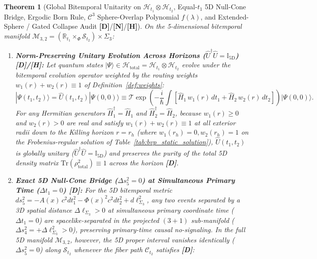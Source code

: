 \documentclass[11pt,a4paper]{article}
\newcommand{\catD}{\textbf{\textcolor{blue!75!black}{[D]}}}
\newcommand{\catH}{\textbf{\textcolor{orange!85!black}{[H]}}}
\newcommand{\catN}{\textbf{\textcolor{teal!75!black}{[N]}}}
\newtheorem{theorem}{Theorem}[section]
\theoremstyle{definition}
\theoremstyle{remark}
\begin{document}
\begin{theorem}[Global Bitemporal Unitarity on $\mathcal{H}_{t_1} \otimes \mathcal{H}_{t_2}$, Equal-$t_1$ 5D Null-Cone Bridge, Ergodic Born Rule, $\mathcal{C}^3$ Sphere-Overlap Polynomial $f(\lambda)$, and Extended-Sphere / Gated Collapse Audit \catD/\catN/\catH]
\label{thm:bitemporal_unitarity_null_bridge}
On the 5-dimensional bitemporal manifold $\mathcal{M}_{3,2} = (\mathbb{R}_{t_1} \times_{\Phi} \mathcal{S}_{t_2}) \times \Sigma_3$:
\begin{enumerate}
  \item[\textnormal{(i)}] \textbf{Norm-Preserving Unitary Evolution Across Horizons ($\hat{U}^\dagger\hat{U} = \mathbb{I}_{5\text{D}}$) \catD/\catH:} Let quantum states $|\Psi\rangle \in \mathcal{H}_{\text{total}} = \mathcal{H}_{t_1} \otimes \mathcal{H}_{t_2}$ evolve under the bitemporal evolution operator weighted by the routing weights $w_1(r) + w_2(r) \equiv 1$ of Definition~\ref{def:weights}:
  \begin{equation}
    |\Psi(t_1,t_2)\rangle = \hat{U}(t_1,t_2)|\Psi(0,0)\rangle \equiv \mathcal{T}\exp\!\left(-\frac{i}{\hbar}\int\left[\hat{H}_1\,w_1(r)\,dt_1 + \hat{H}_2\,w_2(r)\,dt_2\right]\right)|\Psi(0,0)\rangle.
    \label{eq:bitemporal_unitary_operator}
  \end{equation}
  For any Hermitian generators $\hat{H}_1^\dagger = \hat{H}_1$ and $\hat{H}_2^\dagger = \hat{H}_2$, because $w_1(r) \ge 0$ and $w_2(r) > 0$ are real and satisfy $w_1(r) + w_2(r) \equiv 1$ at all exterior radii down to the Killing horizon $r = r_h$ (where $w_1(r_h) = 0, w_2(r_h) = 1$ on the Frobenius-regular solution of Table~\ref{tab:bvp_static_solution}), $\hat{U}(t_1,t_2)$ is globally unitary ($\hat{U}^\dagger\hat{U} = \mathbb{I}_{5\text{D}}$) and preserves the purity of the total 5D density matrix $\text{Tr}(\rho_{\text{total}}^2) \equiv 1$ across the horizon \catD.
  \item[\textnormal{(ii)}] \textbf{Exact 5D Null-Cone Bridge ($\Delta s_5^2 = 0$) at Simultaneous Primary Time ($\Delta t_1 = 0$) \catD:} For the 5D bitemporal metric $ds_5^2 = -A(x)\,c^2 dt_1^2 - \Phi(x)^2 c^2 dt_2^2 + d\ell_{\Sigma_3}^2$, any two events separated by a 3D spatial distance $\Delta\ell_{\Sigma_3} > 0$ at simultaneous primary coordinate time ($\Delta t_1 = 0$) are spacelike-separated in the projected $(3+1)$ sub-manifold ($\Delta s_4^2 = +\Delta\ell_{\Sigma_3}^2 > 0$), preserving primary-time causal no-signaling. In the full 5D manifold $\mathcal{M}_{3,2}$, however, the 5D proper interval vanishes identically ($\Delta s_5^2 = 0$) along $\mathcal{S}_{t_2}$ whenever the fiber path $\mathcal{C}_{t_2}$ satisfies \catD:

\end{enumerate}
\end{theorem}
\end{document}

